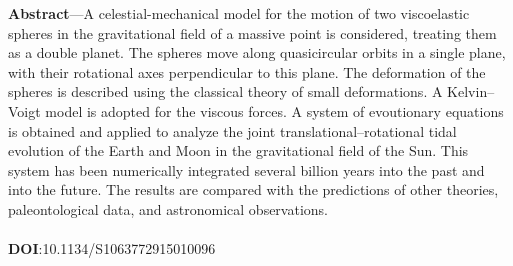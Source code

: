 \documentclass[fontsize = 11pt,a4paper]{article}
\begin{document}
\indent\vbox{
\noindent\textbf{Abstract}—A celestial-mechanical model for the motion of two viscoelastic spheres in the gravitational
field of a massive point is considered, treating them as a double planet. The spheres move along quasicircular
orbits in a single plane, with their rotational axes perpendicular to this plane. The deformation of
the spheres is described using the classical theory of small deformations. A Kelvin–Voigt model is adopted
for the viscous forces. A system of evoutionary equations is obtained and applied to analyze the joint
translational–rotational tidal evolution of the Earth and Moon in the gravitational field of the Sun. This
system has been numerically integrated several billion years into the past and into the future. The results
are compared with the predictions of other theories, paleontological data, and astronomical observations.
\\
\\
\textbf{DOI}:10.1134/S1063772915010096
}
\end{document}
